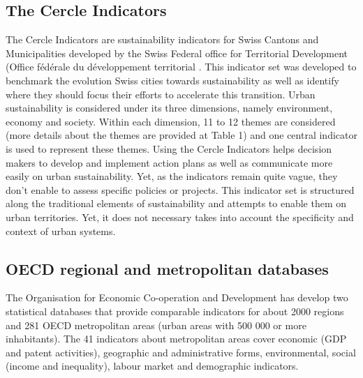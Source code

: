 \documentclass[preprint,12pt]{elsarticle}
\begin{document}
\subsection{The Cercle Indicators}
The Cercle Indicators are sustainability indicators for Swiss Cantons and Municipalities developed by the Swiss Federal office for Territorial Development (Office fédérale du développement territorial \cite{meier2005indicators}. This indicator set was developed to benchmark the evolution Swiss cities towards sustainability as well as identify where they should focus their efforts to accelerate this transition. Urban sustainability is considered under its three dimensions, namely environment, economy and society. Within each dimension, 11 to 12 themes are considered (more details about the themes are provided at Table 1) and one central indicator is used to represent these themes. Using the Cercle Indicators helps decision makers to develop and implement action plans as well as communicate more easily on urban sustainability. Yet, as the indicators remain quite vague, they don’t enable to assess specific policies or projects. This indicator set is structured along the traditional elements of sustainability and attempts to enable them on urban territories. Yet, it does not necessary takes into account the specificity and context of urban systems.


\subsection{OECD regional and metropolitan databases}
The Organisation for Economic Co-operation and Development has develop two statistical databases that provide comparable indicators for about 2000 regions and 281 OECD metropolitan areas (urban areas with 500 000 or more inhabitants). The 41 indicators about metropolitan areas cover economic (GDP and patent activities), geographic and administrative forms, environmental, social (income and inequality), labour market and demographic indicators.
\end{document}
